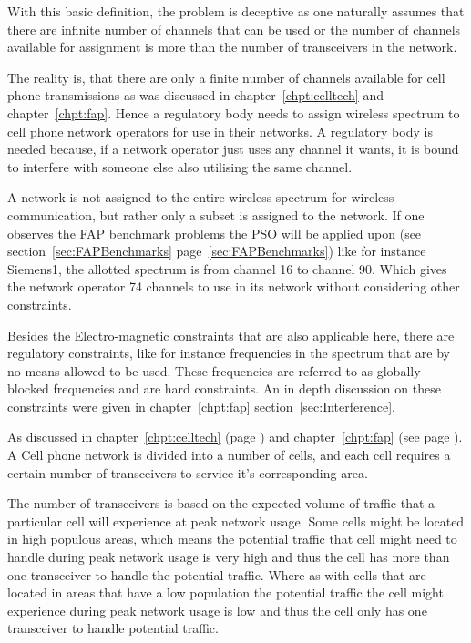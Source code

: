 With this basic definition, the problem is deceptive as one naturally assumes that there are infinite number of channels that can be used or the number of channels available for assignment is more than the number of transceivers in the network. 

The reality is, that there are only a finite number of channels available for cell phone transmissions as was discussed in chapter~\ref{chpt:celltech} and chapter~\ref{chpt:fap}. Hence a regulatory body needs to assign wireless spectrum to cell phone network operators for use in their networks. A regulatory body is needed because, if a network operator just uses any channel it wants, it is bound to interfere with someone else also utilising the same channel.

A network is not assigned to the entire wireless spectrum for wireless communication, but rather only a subset is assigned to the network. If one observes the FAP benchmark problems the PSO will be applied upon (see section~\ref{sec:FAPBenchmarks} page~\ref{sec:FAPBenchmarks}) like for instance Siemens1, the allotted spectrum is from channel 16 to channel 90. Which gives the network operator 74 channels to use in its network without considering other constraints. 

Besides the Electro-magnetic constraints that are also applicable here, there are regulatory constraints, like for instance frequencies in the spectrum that are by no means allowed to be used. These frequencies are referred to as globally blocked frequencies and are hard constraints. An in depth discussion on these constraints were given in chapter~\ref{chpt:fap} section~\ref{sec:Interference}.

As discussed in chapter~\ref{chpt:celltech} (page \pageref{chpt:celltech}) and chapter~\ref{chpt:fap} (see page \pageref{chpt:fap}). A Cell phone network is divided into a number of cells, and each cell requires a certain number of transceivers to service it's corresponding area. 

The number of transceivers is based on the expected volume of traffic that a particular cell will experience at peak network usage. Some cells might be located in high populous areas, which means the potential traffic that cell might need to handle during peak network usage is very high and thus the cell has more than one transceiver to handle the potential traffic. Where as with cells that are located in areas that have a low population the potential traffic the cell might experience during peak network usage is low and thus the cell only has one transceiver to handle potential traffic.

